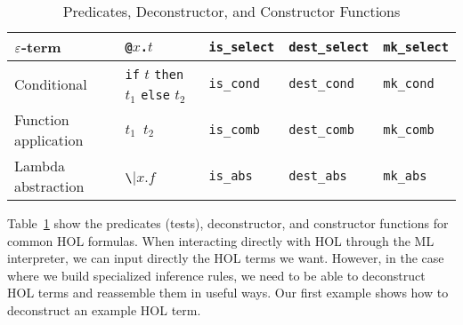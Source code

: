 \begin{table}[tb]
\begin{tabular}{|l|l|l|l|l|}
    \hline
    $\varepsilon$-term & {\small\verb|@|}$x${\small\verb|.|}$t$ & \small{\verb|is_select|}& \small{\verb|dest_select|}& \small{\verb|mk_select|}\\
    \hline
    Conditional & {\small\verb|if|} $t$ {\small\verb|then|} $t_1$
              {\small\verb|else|} $t_2$ &\small{\verb|is_cond|} & \small{\verb|dest_cond|}& \small{\verb|mk_cond|}\\
    \hline
    Function application & $t_1${\small{\verb| |}$t_2$} & \small{\verb|is_comb|}& \small{\verb|dest_comb|}& \small{\verb|mk_comb|}\\
    \hline
    Lambda abstraction & \verb|\|$x.f$ & \small{\verb|is_abs|}&\small{ }\verb|dest_abs|&\small{\verb|mk_abs|}\\
    \hline
  \end{tabular}
  \caption{Predicates, Deconstructor, and Constructor Functions}
  \label{tab:constructors-deconstructors}
\end{table}

Table~\ref{tab:constructors-deconstructors} show the predicates
(tests), deconstructor, and constructor functions for common HOL
formulas. When interacting directly with HOL through the ML
interpreter, we can input directly the HOL terms we want. However, in
the case where we build specialized inference rules, we need to be
able to deconstruct HOL terms and reassemble them in useful ways. Our
first example shows how to deconstruct an example HOL term.

